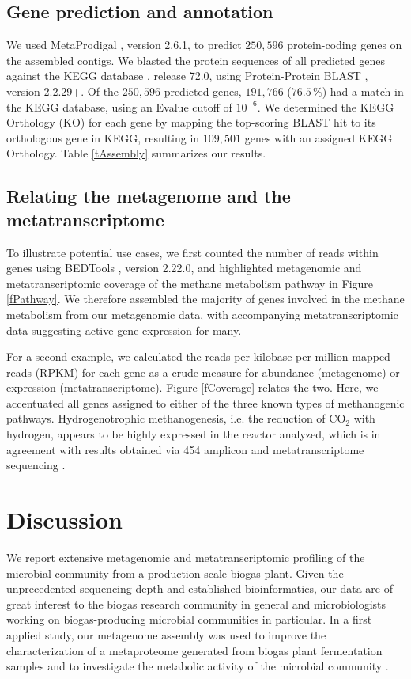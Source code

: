 \documentclass{bmcart}
\begin{document}
\subsection*{Gene prediction and annotation}
We used MetaProdigal \cite{MetaProdigal}, version 2.6.1, to predict $250,596$ protein-coding genes on the assembled contigs.
We blasted the protein sequences of all predicted genes against the KEGG database \cite{KeggDB}, release 72.0, using Protein-Protein BLAST \cite{BlastPlus}, version 2.2.29+. 
Of the $250,596$ predicted genes, $191,766$ ($76.5\,\%$) had a match in the KEGG database, using an Evalue cutoff of $10^{-6}$.
We determined the KEGG Orthology (KO) for each gene by mapping the top-scoring BLAST hit to its orthologous gene in KEGG, resulting in $109,501$ genes with an assigned KEGG Orthology.
Table \ref{tAssembly} summarizes our results.

\subsection*{Relating the metagenome and the metatranscriptome}
To illustrate potential use cases, we first counted the number of reads within genes using BEDTools \cite{BEDTools}, version 2.22.0, and highlighted metagenomic and metatranscriptomic coverage of the methane metabolism pathway in Figure \ref{fPathway}.
We therefore assembled the majority of genes involved in the methane metabolism from our metagenomic data, with accompanying metatranscriptomic data suggesting active gene expression for many.

For a second example, we calculated the reads per kilobase per million mapped reads (RPKM) for each gene as a crude measure for abundance (metagenome) or expression (metatranscriptome).
Figure \ref{fCoverage} relates the two. Here, we accentuated all genes assigned to either of the three known types of methanogenic pathways.
Hydrogenotrophic methanogenesis, i.e. the reduction of CO$_{\text{2}}$ with hydrogen, appears to be highly expressed in the reactor analyzed, which is in agreement with results obtained via 454 amplicon and metatranscriptome sequencing \cite{Zakrzewski2012}.

\section*{Discussion}

We report extensive metagenomic and metatranscriptomic profiling of the microbial community from a production-scale biogas plant.
Given the unprecedented sequencing depth and established bioinformatics, our data are of great interest to the biogas research community in general and microbiologists working on biogas-producing microbial communities in particular.
In a first applied study, our metagenome assembly was used to improve the characterization of a metaproteome generated from biogas plant fermentation samples and to investigate the metabolic activity of the microbial community \cite{Kohrs2015}.
\end{document}
